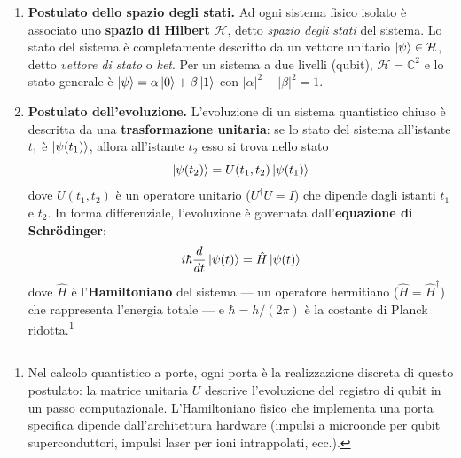 \begin{onehalfspace}
\begin{enumerate}
    \item \textbf{Postulato dello spazio degli stati.} Ad ogni sistema fisico isolato è associato uno \textbf{spazio di Hilbert} $\mathcal{H}$, detto \textit{spazio degli stati} del sistema. Lo stato del sistema è completamente descritto da un vettore unitario $\ket{\psi} \in \mathcal{H}$, detto \textit{vettore di stato} o \textit{ket}. Per un sistema a due livelli (qubit), $\mathcal{H} = \mathbb{C}^2$ e lo stato generale è $\ket{\psi} = \alpha\ket{0} + \beta\ket{1}$ con $|\alpha|^2 + |\beta|^2 = 1$.

    \item \textbf{Postulato dell'evoluzione.} L'evoluzione di un sistema quantistico chiuso è descritta da una \textbf{trasformazione unitaria}: se lo stato del sistema all'istante $t_1$ è $\ket{\psi(t_1)}$, allora all'istante $t_2$ esso si trova nello stato
    \begin{equation}
        \ket{\psi(t_2)} = U(t_1, t_2)\ket{\psi(t_1)}
    \end{equation}
    dove $U(t_1, t_2)$ è un operatore unitario ($U^\dagger U = I$) che dipende dagli istanti $t_1$ e $t_2$. In forma differenziale, l'evoluzione è governata dall'\textbf{equazione di Schrödinger}:
    \begin{equation}
        i\hbar \frac{d}{dt}\ket{\psi(t)} = \hat{H}\ket{\psi(t)}
    \end{equation}
    dove $\hat{H}$ è l'\textbf{Hamiltoniano} del sistema --- un operatore hermitiano ($\hat{H} = \hat{H}^\dagger$) che rappresenta l'energia totale --- e $\hbar = h/(2\pi)$ è la costante di Planck ridotta.\footnote{Nel calcolo quantistico a porte, ogni porta è la realizzazione discreta di questo postulato: la matrice unitaria $U$ descrive l'evoluzione del registro di qubit in un passo computazionale. L'Hamiltoniano fisico che implementa una porta specifica dipende dall'architettura hardware (impulsi a microonde per qubit superconduttori, impulsi laser per ioni intrappolati, ecc.).}


\end{enumerate}
\end{onehalfspace}
